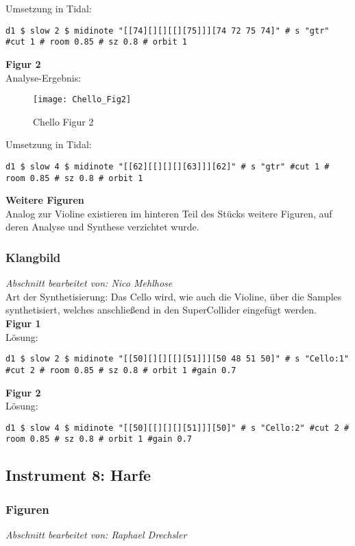 \documentclass[
10pt, %
a4paper, %
oneside, %
headinclude,footinclude, %
BCOR5mm, %
]{scrartcl}
\begin{document}
\noindent Umsetzung in Tidal:
\begin{lstlisting}
d1 $ slow 2 $ midinote "[[74][][][[][75]]][74 72 75 74]" # s "gtr" #cut 1 # room 0.85 # sz 0.8 # orbit 1
\end{lstlisting}

\noindent\textbf{Figur 2}\\
Analyse-Ergebnis:
\begin{figure}[h]
	\centering 
	\texttt{[image: Chello\_Fig2]} 
	\caption{Chello Figur 2}
\end{figure}

\noindent Umsetzung in Tidal:
\begin{lstlisting}
d1 $ slow 4 $ midinote "[[62][[][][][63]]][62]" # s "gtr" #cut 1 # room 0.85 # sz 0.8 # orbit 1
\end{lstlisting}

\noindent\textbf{Weitere Figuren}\\
Analog zur Violine existieren im hinteren Teil des Stücks weitere Figuren, auf deren Analyse und Synthese verzichtet wurde.

\subsubsection{Klangbild}
\textit{Abschnitt bearbeitet von: Nico Mehlhose}\\

\noindent 
Art der Synthetisierung: Das Cello wird, wie auch die Violine, über die Samples synthetisiert\cite{Orch}, welches anschließend in den SuperCollider eingefügt werden.\\

\noindent\textbf{Figur 1}\\
Lösung:
\begin{lstlisting}
d1 $ slow 2 $ midinote "[[50][][][[][51]]][50 48 51 50]" # s "Cello:1" #cut 2 # room 0.85 # sz 0.8 # orbit 1 #gain 0.7
\end{lstlisting}
\noindent\textbf{Figur 2}\\
Lösung:
\begin{lstlisting}
d1 $ slow 4 $ midinote "[[50][[][][][51]]][50]" # s "Cello:2" #cut 2 # room 0.85 # sz 0.8 # orbit 1 #gain 0.7
\end{lstlisting}

\subsection{Instrument 8: Harfe}
\subsubsection{Figuren}
\textit{Abschnitt bearbeitet von: Raphael Drechsler}\\
\end{document}

